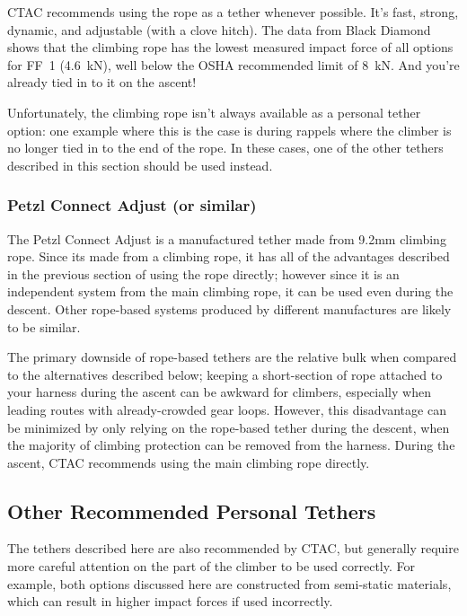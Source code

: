 \documentclass[nonacm,acmtog]{acmart}
\begin{document}
   CTAC recommends using the rope as a tether whenever possible.  It's fast,
   strong, dynamic, and adjustable (with a clove hitch).  The data from Black
   Diamond shows that the climbing rope has the lowest measured impact force of
   all options for FF~1 (4.6~kN), well below the OSHA recommended limit of 8~kN.
   And you're already tied in to it on the ascent!

   Unfortunately, the climbing rope isn't always available as a personal tether
   option: one example where this is the case is during rappels where the
   climber is no longer tied in to the end of the rope.  In these cases, one of
   the other tethers described in this section should be used instead.

\subsubsection{Petzl Connect Adjust (or similar)}

   The Petzl Connect Adjust is a manufactured tether made from 9.2mm climbing
   rope.  Since its made from a climbing rope, it has all of the advantages
   described in the previous section of using the rope directly; however since
   it is an independent system from the main climbing rope, it can be used even
   during the descent.  Other rope-based systems produced by different
   manufactures are likely to be similar.

   The primary downside of rope-based tethers are the relative bulk when
   compared to the alternatives described below; keeping a short-section of rope
   attached to your harness during the ascent can be awkward for climbers,
   especially when leading routes with already-crowded gear loops.  However,
   this disadvantage can be minimized by only relying on the rope-based tether
   during the descent, when the majority of climbing protection can be removed
   from the harness.  During the ascent, CTAC recommends using the main climbing
   rope directly.

\subsection{Other Recommended Personal Tethers}

   The tethers described here are also recommended by CTAC, but generally
   require more careful attention on the part of the climber to be used
   correctly.  For example, both options discussed here are constructed from
   semi-static materials, which can result in higher impact forces if used
   incorrectly.
\end{document}
